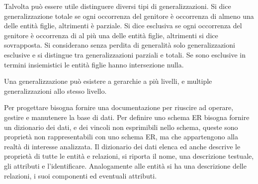\documentclass{article}
\numberwithin{equation}{subsection}
\begin{document}
Talvolta può essere utile distinguere diversi tipi di generalizzazioni. Si dice generalizzazione totale se ogni occorrenza del genitore è occorrenza di almeno 
una delle entità figlie, altrimenti è parziale. Si dice esclusiva se ogni occorrenza del genitore è occorrenza di al più una delle entità figlie, 
altrimenti si dice sovrapposta. 
Si considerano senza perdita di generalità solo generalizzazioni esclusive e si distingue tra generalizzazioni parziali e totali. 
Se sono esclusive in termini insiemistici le entità figlie hanno intersezione nulla. 

Una generalizzazione può esistere a gerarchie a più livelli, e multiple generalizzazioni allo stesso livello. %

Per progettare bisogna fornire una documentazione per riuscire ad operare, gestire e manutenere la base di dati. 
Per definire uno schema ER bisogna fornire un dizionario dei dati, e dei vincoli non esprimibili nello schema, queste sono proprietà non rappresentabili con uno 
schema ER, ma che appartengono alla realtà di interesse analizzata. 
Il dizionario dei dati elenca ed anche descrive le proprietà di tutte le entità e relazioni, si riporta il nome, una descrizione testuale, gli attributi e 
l'identificare. 
Analogamente alle entità si ha una descrizione delle relazioni, i suoi componenti ed eventuali attributi. 
\end{document}
